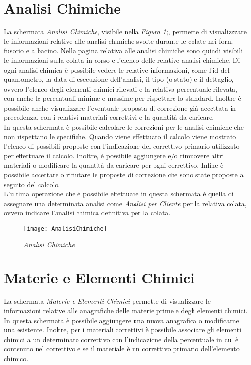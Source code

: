   \section{Analisi Chimiche}
  La schermata \textit{Analisi Chimiche}, visibile nella \textit{Figura \ref{fig:AnalisiChimiche}};,
  permette di visualizzzare le informazioni relative alle
  analisi chimiche svolte durante le colate nei forni fusorio e a bacino. Nella pagina relativa alle analisi chimiche sono
  quindi visibili le informazioni sulla colata in corso e l'elenco delle relative analisi chimiche. Di ogni analisi chimica
  è possibile vedere le relative informazioni, come l'id del quantometro, la data di esecuzione dell'analisi, il tipo (o stato) e
  il dettaglio, ovvero l'elenco degli elementi chimici rilevati e la relativa percentuale rilevata, con anche le percentuali
  minime e massime per rispettare lo standard. Inoltre è possibile anche visualizzare l'eventuale proposta di correzione già
  accettata in precedenza, con i relativi materiali correttivi e la quantità da caricare.\\
  In questa schermata è possibile calcolare le correzioni per le analisi chimiche che non rispettano le specifiche. Quando
  viene effettuato il calcolo viene mostrato l'elenco di possibili proposte con l'indicazione del correttivo primario utilizzato
  per effettuare il calcolo. Inoltre, è possibile aggiungere e/o rimuovere altri materiali o modificare la quantità da caricare
  per ogni correttivo. Infine è possibile accettare o rifiutare le proposte di correzione che sono state proposte a seguito del
  calcolo.\\
  L'ultima operazione che è possibile effettuare in questa schermata è quella di assegnare una determinata analisi come
  \textit{Analisi per Cliente} per la relativa colata, ovvero indicare l'analisi chimica definitiva per la colata.

  \begin{figure}[H]
    \texttt{[image: AnalisiChimiche]}
    \centering
    \caption{\textit{Analisi Chimiche}} 
    \label{fig:AnalisiChimiche}
  \end{figure}

  \section{Materie e Elementi Chimici}
  La schermata \textit{Materie e Elementi Chimici} permette di visualizzare le informazioni
  relative alle anagrafiche delle materie prime e degli elementi chimici. In questa schermata è possibile aggiungere una nuova
  anagrafica o modificarne una esistente. Inoltre, per i materiali correttivi è possibile associare gli elementi chimici
  a un determinato correttivo con l'indicazione della percentuale in cui è contenuto nel correttivo e se il materiale è un
  correttivo primario dell'elemento chimico. 

